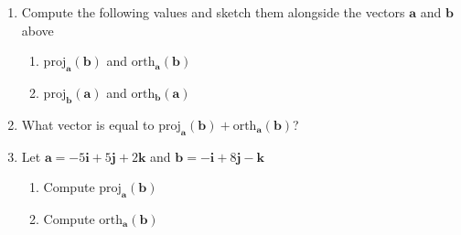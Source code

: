 \documentclass[12pt]{exam}
\newcommand{\ba}{\bm{a}}
\newcommand{\bb}{\bm{b}}
\begin{document}
\begin{enumerate}
  \item Compute the following values and sketch them alongside the vectors \(\ba\) and \(\bb\) above
\begin{enumerate}
    \item \(\mathrm{proj}_{\ba}(\bb)\) and \(\mathrm{orth}_{\ba}(\bb)\)
    \item \(\mathrm{proj}_{\bb}(\ba)\) and \(\mathrm{orth}_{\bb}(\ba)\)
\end{enumerate}
    \item What vector is equal to \(\mathrm{proj}_{\ba}(\bb)+\mathrm{orth}_{\ba}(\bb)\)?
    \item Let \(\ba=-5\bm{i}+5\bm{j}+2\bm{k}\) and \(\bb=-\bm{i}+8\bm{j}-\bm{k}\)
    \begin{enumerate}
        \item Compute \(\mathrm{proj_{\ba}(\bb)}\) 
        \item Compute \(\mathrm{orth_{\ba}(\bb)}\)
    \end{enumerate}
\end{enumerate}





\end{document}
